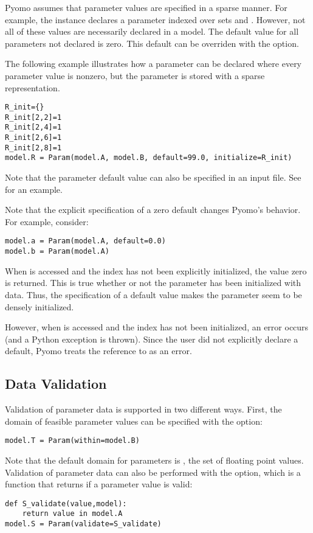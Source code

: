 Pyomo assumes that parameter values are specified in a sparse manner.  For
example, the instance  declares a parameter indexed
over sets  and .  However, not all of these values are necessarily
declared in a model.  The default value for all parameters not declared
is zero. This default can be overriden with the  option.

The following example illustrates how a parameter can be declared where
every parameter value is nonzero, but the parameter is stored with a sparse
representation.
\begin{lstlisting}
R_init={}
R_init[2,2]=1
R_init[2,4]=1
R_init[2,6]=1
R_init[2,8]=1
model.R = Param(model.A, model.B, default=99.0, initialize=R_init)
\end{lstlisting}
Note that the parameter default value can also be specified in an input 
file.  See  for an example.

Note that the explicit specification of a zero default changes Pyomo's
behavior.  For example, consider:
\begin{lstlisting}
model.a = Param(model.A, default=0.0)
model.b = Param(model.A)
\end{lstlisting}
When  is accessed and the index has not been explicitly initialized,
the value zero is returned.  This is true whether or not the parameter has
been initialized with data.  Thus, the specification of a default value
makes the parameter seem to be densely initialized.

However, when  is accessed and the
index has not been initialized, an error occurs (and a Python exception is
thrown).  Since the user did not explicitly declare a default, Pyomo 
treats the reference to  as an error.


\subsection{Data Validation}

Validation of parameter data is supported in two different ways.  First, 
the domain of feasible parameter values can be specified with the 
option:
\begin{lstlisting}
model.T = Param(within=model.B)
\end{lstlisting}
Note that the default domain for parameters is , the set of floating
point values. Validation of parameter data can also be performed with the  option, which is a function that returns  if a parameter value is valid:
\begin{lstlisting}
def S_validate(value,model):
    return value in model.A
model.S = Param(validate=S_validate)
\end{lstlisting}


